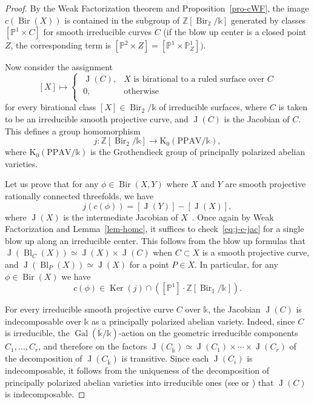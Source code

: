 \documentclass[a4paper,12pt]{amsart}
\def\k{\mathbb k}
\def\P{\mathbb P}
\def\Z{\mathbb Z}
\def\Ker{{\operatorname{Ker}}}
\def\Bl{{\operatorname{Bl}}}
\def\Bir{{\operatorname{Bir}}}
\def\Gal{{\operatorname{Gal}}}
\def\Jac{{\operatorname{J}}}
\def\ol{\overline}
\def\Kt{{\mathrm{K}}}
\def\PPAV{{\mathrm{PPAV}}}
\theoremstyle{plain}
\numberwithin{equation}{section}
\theoremstyle{definition}
\renewcommand{\(}{\left(}
\renewcommand{\)}{\right)}
\begin{document}
\begin{proof}
By the
Weak Factorization theorem
and Proposition~\ref{pro-cWF},
the image $c(\Bir(X))$ is contained
in the subgroup of $\Z[\Bir_2/\k]$
generated by classes $[\P^1 \times C]$
for smooth irreducible curves $C$
(if the blow up center is a closed point $Z$, the
corresponding term is $[\P^2 \times Z]
= [\P^1 \times \P^1_Z])$.

Now consider the assignment
\begin{equation}\label{eq:j}
[X] \mapsto \left\{\begin{array}{cl}
     \; \Jac(C), & \text{$X$ is birational to a 
     ruled surface over $C$} \\
     \; 0, & \text{otherwise} \\
\end{array}\right.
\end{equation}
for every birational class $[X] \in \Bir_2/\k$ of irreducible surfaces, where
$C$ is taken to be an irreducible smooth projective curve,
and $\Jac(C)$ is the Jacobian of $C$.
This defines a
group homomorphism 
$$j: \Z[\Bir_2/\k] \to 
\Kt_0(\PPAV/\k),$$
where $\Kt_0(\PPAV/\k)$ is the Grothendieck 
group of principally
polarized abelian varieties.


Let us prove that
for any $\phi \in \Bir(X,Y)$
where $X$ and $Y$ are
smooth projective rationally connected threefolds, we have
\begin{equation}\label{eq:j-c-jac}
j(c(\phi)) = [\Jac(Y)] - [\Jac(X)],
\end{equation}
where $\Jac(X)$ is the intermediate Jacobian of $X$~\cite{BenoistWittenbergPerf}.
Once again by Weak Factorization
and Lemma~\ref{lem-homc},
it suffices to check~\eqref{eq:j-c-jac}
for a single blow up along an irreducible center. 
This follows from
the blow up formulas
\cite[Lemma 2.10]{BenoistWittenbergPerf}
that $\Jac(\Bl_C(X)) \simeq \Jac(X) \times \Jac(C)$ 
when $C \subset X$ is a smooth projective curve,
and $\Jac(\Bl_P(X)) \simeq \Jac(X)$ for a point $P \in X$.
In particular, for any $\phi \in \Bir(X)$ we have
$$c(\phi) \in \Ker(j) \cap ([\P^1] \cdot \Z[\Bir_1/\k]).$$

For every irreducible smooth projective curve $C$ over $\k$,
the Jacobian $\Jac(C)$ is indecomposable over $\k$ 
as a principally polarized abelian variety.
Indeed, since $C$ is irreducible,
the $\Gal(\ol{\k}/\k)$-action on the geometric
irreducible components $C_1,\ldots,C_r$,
and therefore on the factors
$\Jac(C_{\ol{\k}}) \simeq \Jac(C_1) \times \cdots \times \Jac(C_r)$
of the decomposition of $\Jac(C_{\ol{\k}})$ is transitive.
Since each $\Jac(C_i)$ is indecomposable,
it follows from the uniqueness of the 
decomposition of principally polarized abelian varieties into irreducible ones
(see \cite[Theorem 3.3]{jordan2016unique} or \cite{DebarrePAV})
that $\Jac(C)$ is indecomposable.


\end{proof}
\end{document}

